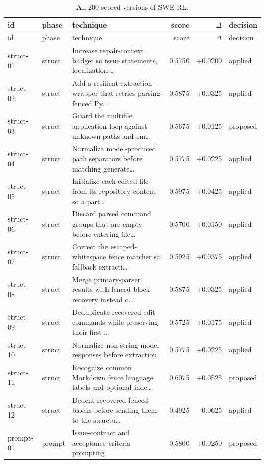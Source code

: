 \begin{center}\scriptsize\begin{longtable}{llp{5.2cm}rrl}
\caption{All 200 scored versions of SWE-RL.}\\
\toprule id & phase & technique & score & $\Delta$ & decision \\ \midrule \endfirsthead
\toprule id & phase & technique & score & $\Delta$ & decision \\ \midrule \endhead
struct-01 & struct & Increase repair-context budget so issue statements, localization \ldots{} & 0.5750 & +0.0200 & applied \\
struct-02 & struct & Add a resilient extraction wrapper that retries parsing fenced Py\ldots{} & 0.5875 & +0.0325 & applied \\
struct-03 & struct & Guard the multifile application loop against unknown paths and em\ldots{} & 0.5675 & +0.0125 & proposed \\
struct-04 & struct & Normalize model-produced path separators before matching generate\ldots{} & 0.5775 & +0.0225 & applied \\
struct-05 & struct & Initialize each edited file from its repository content so a part\ldots{} & 0.5975 & +0.0425 & applied \\
struct-06 & struct & Discard parsed command groups that are empty before entering file\ldots{} & 0.5700 & +0.0150 & applied \\
struct-07 & struct & Correct the escaped-whitespace fence matcher so fallback extracti\ldots{} & 0.5925 & +0.0375 & applied \\
struct-08 & struct & Merge primary-parser results with fenced-block recovery instead o\ldots{} & 0.5875 & +0.0325 & applied \\
struct-09 & struct & Deduplicate recovered edit commands while preserving their first-\ldots{} & 0.5725 & +0.0175 & applied \\
struct-10 & struct & Normalize non-string model responses before extraction & 0.5775 & +0.0225 & applied \\
struct-11 & struct & Recognize common Markdown fence language labels and optional inde\ldots{} & 0.6075 & +0.0525 & proposed \\
struct-12 & struct & Dedent recovered fenced blocks before sending them to the structu\ldots{} & 0.4925 & -0.0625 & applied \\
prompt-01 & prompt & Issue-contract and acceptance-criteria prompting & 0.5800 & +0.0250 & proposed \\

\end{longtable}
\end{center}
